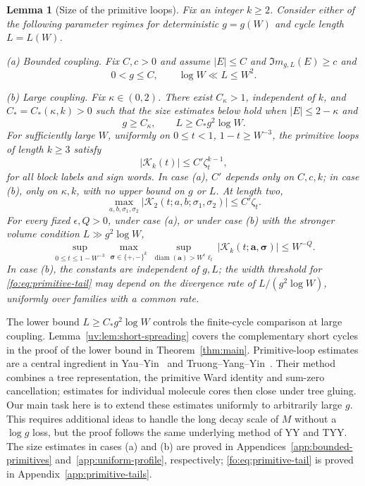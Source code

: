 \documentclass[11pt]{article}
\numberwithin{equation}{section}
\newtheorem{lemma}[theorem]{Lemma}
\theoremstyle{remark}
\newcommand{\diam}{\operatorname{diam}}
\newcommand{\cK}{\mathcal K}
\begin{document}
\begin{lemma}[Size of the primitive loops]\label{fo:lem:deterministic}
Fix an integer $k\ge2$. Consider either of the following parameter regimes for deterministic
$g=g(W)$ and cycle length $L=L(W)$.

\textup{(a) Bounded coupling.} Fix $C,c>0$ and assume $|E|\le C$ and
$\Im m_{g,L}(E)\ge c$ and 
\[
 0<g\le C,\qquad \log W\ll L\le W^2.
\]

\textup{(b) Large coupling.} Fix $\kappa\in(0,2)$.
There exist $C_\kappa>1$, independent of $k$, and $C_*=C_*(\kappa,k)>0$
such that the size estimates below hold when $|E|\le2-\kappa$ and
\begin{equation}\label{fo:eq:polynomial-large-range}
 g\ge C_\kappa,\qquad L\ge C_*g^2\log W.
\end{equation}
For sufficiently large $W$, uniformly on
$0\le t<1$, $1-t\ge W^{-3}$, the primitive loops of length $k\ge3$ satisfy
\begin{equation}\label{fo:eq:primitivebound}
 |\cK_k(t)|\le C'\zeta_t^{k-1},
\end{equation}
for all block labels and sign words. In case \textup{(a)}, $C'$ depends
only on $C,c,k$; in case \textup{(b)}, only on $\kappa,k$, with no
upper bound on $g$ or $L$. At length two,
\[
 \max_{a,b,\sigma_1,\sigma_2}
       |\cK_2(t;a,b;\sigma_1,\sigma_2)|\le C'\zeta_t.
\]
For every fixed $\epsilon,Q>0$, under case \textup{(a)}, or under
case \textup{(b)} with the stronger volume condition $L\gg g^2\log W$,
\begin{equation}\label{fo:eq:primitive-tail}
 \sup_{0\le t\le1-W^{-3}}\max_{\boldsymbol\sigma\in\{+,-\}^k}
 \sup_{\diam(\boldsymbol a)>W^\epsilon\ell_t}
       |\cK_k(t;\boldsymbol a,\boldsymbol\sigma)|\le W^{-Q}.
\end{equation}
In case \textup{(b)}, the constants are independent of $g,L$; the width
threshold for \eqref{fo:eq:primitive-tail} may depend on the divergence
rate of $L/(g^2\log W)$, uniformly over families with a common rate.
\end{lemma}

The lower bound $L\ge C_*g^2\log W$ controls the finite-cycle comparison
at large coupling. Lemma~\ref{uv:lem:short-spreading} covers the
complementary short cycles in the proof of the lower bound in
Theorem~\ref{thm:main}.
Primitive-loop estimates are a central ingredient in
Yau--Yin~\cite[Section~3 and Lemma~2.17]{YY} and
Truong--Yang--Yin~\cite[Section~4 and Lemma~3.15]{TYY}.
Their method combines a tree representation, the primitive Ward identity
and sum-zero cancellation; estimates for individual molecule cores then close under tree
gluing. Our main task here is to extend these estimates uniformly to
arbitrarily large $g$. This requires additional ideas to handle the long
decay scale of $M$ without a $\log g$ loss, but the proof follows the
same underlying method of YY and TYY.
The size estimates in cases \textup{(a)} and \textup{(b)} are proved in
Appendices~\ref{app:bounded-primitives} and~\ref{app:uniform-profile},
respectively; \eqref{fo:eq:primitive-tail} is proved in
Appendix~\ref{app:primitive-tails}.
\end{document}
